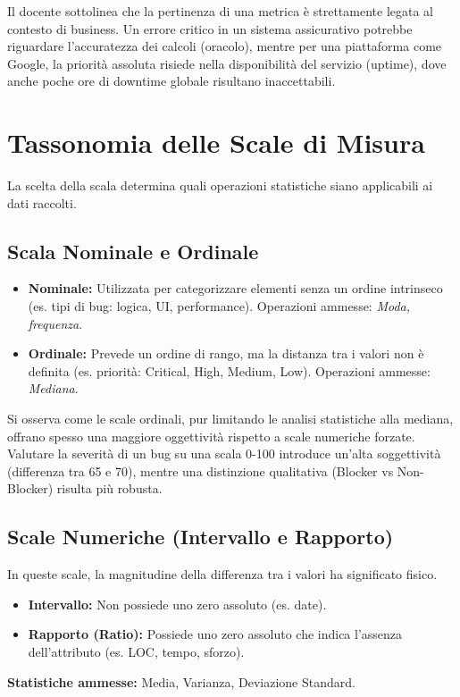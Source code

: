 \begin{notaprof}
Il docente sottolinea che la pertinenza di una metrica è strettamente legata al contesto di business. Un errore critico in un sistema assicurativo potrebbe riguardare l'accuratezza dei calcoli (oracolo), mentre per una piattaforma come Google, la priorità assoluta risiede nella disponibilità del servizio (uptime), dove anche poche ore di downtime globale risultano inaccettabili.
\end{notaprof}

\section{Tassonomia delle Scale di Misura}
La scelta della scala determina quali operazioni statistiche siano applicabili ai dati raccolti.

\subsection{Scala Nominale e Ordinale}
\begin{itemize}
    \item \textbf{Nominale:} Utilizzata per categorizzare elementi senza un ordine intrinseco (es. tipi di bug: logica, UI, performance). Operazioni ammesse: \textit{Moda, frequenza}.
    \item \textbf{Ordinale:} Prevede un ordine di rango, ma la distanza tra i valori non è definita (es. priorità: Critical, High, Medium, Low). Operazioni ammesse: \textit{Mediana}.
\end{itemize}

\begin{notaprof}
Si osserva come le scale ordinali, pur limitando le analisi statistiche alla mediana, offrano spesso una maggiore oggettività rispetto a scale numeriche forzate. Valutare la severità di un bug su una scala 0-100 introduce un'alta soggettività (differenza tra 65 e 70), mentre una distinzione qualitativa (Blocker vs Non-Blocker) risulta più robusta.
\end{notaprof}

\subsection{Scale Numeriche (Intervallo e Rapporto)}
In queste scale, la magnitudine della differenza tra i valori ha significato fisico.
\begin{itemize}
    \item \textbf{Intervallo:} Non possiede uno zero assoluto (es. date).
    \item \textbf{Rapporto (Ratio):} Possiede uno zero assoluto che indica l'assenza dell'attributo (es. LOC, tempo, sforzo).
\end{itemize}
\textbf{Statistiche ammesse:} Media, Varianza, Deviazione Standard.

